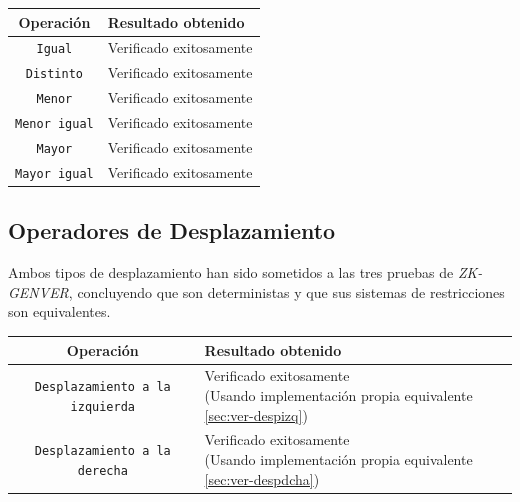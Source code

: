 \documentclass[a4paper,12pt]{report}
\begin{document}
	
	\vspace{0.5cm}
	\begingroup %
	\renewcommand{\arraystretch}{2} 
	\begin{longtable}{|c|>{\centering\arraybackslash}m{10cm}|}
		\hline
		\textbf{Operación} & \textbf{Resultado obtenido} \\
		\hline
		
		\texttt{Igual} & Verificado exitosamente \checkmark \\
		\hline
		
		\texttt{Distinto} & 
		Verificado exitosamente \checkmark \\
		\hline
		
		\texttt{Menor} & 
		Verificado exitosamente \checkmark \\
		\hline
		
		\texttt{Menor igual} & Verificado exitosamente \checkmark \\ 
		\hline
		
		\texttt{Mayor} & Verificado exitosamente \checkmark \\
		\hline
		
		\texttt{Mayor igual} & Verificado exitosamente \checkmark \\
		\hline
	\end{longtable}
	\endgroup
	
	
	
	\subsection{Operadores de Desplazamiento}
	
	\vspace{0.2cm}
	\noindent Ambos tipos de desplazamiento han sido sometidos a las tres pruebas de \textit{ZK-GENVER}, concluyendo que son deterministas y que sus sistemas de restricciones son equivalentes.
	
	\vspace{0.5cm}
	\begingroup %
	\renewcommand{\arraystretch}{2} 
	\begin{longtable}{|c|>{\centering\arraybackslash}m{10cm}|}
		\hline
		\textbf{Operación} & \textbf{Resultado obtenido} \\
		\hline
		
		\texttt{Desplazamiento a la izquierda} & \makecell[c]{Verificado exitosamente \checkmark \\ \footnotesize (Usando implementación propia equivalente \ref{sec:ver-despizq})} \\
		\hline
		
		\texttt{Desplazamiento a la derecha} & \makecell[c]{Verificado exitosamente \checkmark \\ \footnotesize (Usando implementación propia equivalente \ref{sec:ver-despdcha})} \\
		\hline
		
	\end{longtable}
	\endgroup
	
\end{document}
